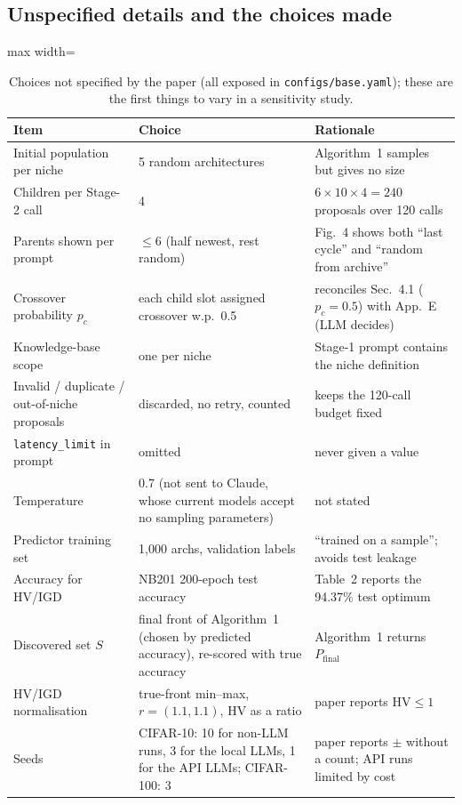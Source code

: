 \documentclass[preprint,12pt]{elsarticle}
\newcommand{\code}[1]{\texttt{#1}}
\newcommand{\HV}{\mathrm{HV}}
\begin{document}
\subsection{Unspecified details and the choices made}\label{sec:assumed}
\begin{table}[h]\centering\small
\caption{Choices not specified by the paper (all exposed in \code{configs/base.yaml}); these are the first things to vary in a sensitivity study.}\label{tab:assumed}
\begin{adjustbox}{max width=\linewidth}
\begin{tabular}{p{4.6cm}p{4.0cm}p{6.2cm}}
\toprule
Item & Choice & Rationale \\
\midrule
Initial population per niche & 5 random architectures & Algorithm~1 samples but gives no size \\
Children per Stage-2 call & 4 & $6\times10\times4=240$ proposals over 120 calls \\
Parents shown per prompt & $\le6$ (half newest, rest random) & Fig.~4 shows both ``last cycle'' and ``random from archive'' \\
Crossover probability $p_c$ & each child slot assigned crossover w.p.\ 0.5 & reconciles Sec.~4.1 ($p_c{=}0.5$) with App.~E (LLM decides) \\
Knowledge-base scope & one per niche & Stage-1 prompt contains the niche definition \\
Invalid / duplicate / out-of-niche proposals & discarded, no retry, counted & keeps the 120-call budget fixed \\
\code{latency\_limit} in prompt & omitted & never given a value \\
Temperature & 0.7 (not sent to Claude, whose current models accept no sampling parameters) & not stated \\
Predictor training set & 1{,}000 archs, validation labels & ``trained on a sample''; avoids test leakage \\
Accuracy for HV/IGD & NB201 200-epoch test accuracy & Table~2 reports the 94.37\% test optimum \\
Discovered set $S$ & final front of Algorithm~1 (chosen by predicted accuracy), re-scored with true accuracy & Algorithm~1 returns $P_{\text{final}}$ \\
HV/IGD normalisation & true-front min--max, $r=(1.1,1.1)$, HV as a ratio & paper reports $\HV\le1$ \\
Seeds & CIFAR-10: 10 for non-LLM runs, 3 for the local LLMs, 1 for the API LLMs; CIFAR-100: 3 & paper reports $\pm$ without a count; API runs limited by cost \\
\bottomrule
\end{tabular}
\end{adjustbox}
\end{table}
\end{document}
